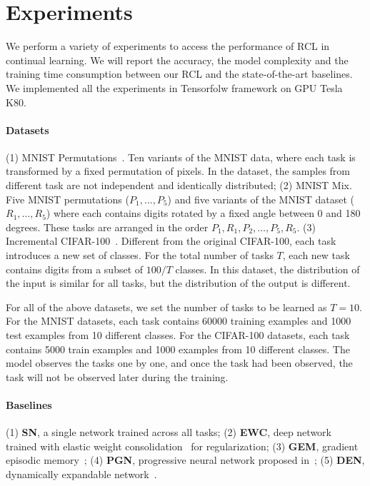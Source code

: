 \documentclass{article}
\begin{document}
\section{Experiments}
\label{sec:exp}
We perform a variety of experiments to access the performance of RCL in continual learning. We will report the accuracy, the model complexity and the training time consumption between our RCL and the state-of-the-art baselines. We implemented all the experiments in Tensorfolw framework on GPU Tesla K80. 

\paragraph{Datasets}
(1) MNIST Permutations~\cite{kirkpatrick1}. Ten variants of the MNIST data, where each task is transformed by a fixed permutation of
pixels. In the dataset, the samples from different task are not independent and identically distributed;
(2) MNIST Mix. Five MNIST permutations ($P_1,\dots,P_5$) and five variants of the MNIST dataset ($R_1,\dots,R_5$) where each contains digits rotated by a fixed angle between 0 and 180 degrees. These tasks are arranged in the order $P_1,R_1, P_2,\dots,P_5,R_5$.  
(3) Incremental CIFAR-100~\cite{icart}. Different from the original CIFAR-100, each task introduces a new set of classes. For the total number of tasks $T$, each new task contains digits from a subset of $100/T$ classes. In this dataset, the distribution of the input is similar for all tasks, but the distribution of the output is different.

For all of the above datasets, we set the number of tasks to be learned as $T = 10$. For the MNIST datasets, each task contains 60000 training examples and 1000 test examples from 10 different classes. For the CIFAR-100 datasets, each task contains 5000 train examples and 1000 examples from 10 different classes. The model observes the tasks one by one, and once the task had been observed, the task will not be observed later during the training.


\paragraph{Baselines}
(1) \textbf{SN}, a single network trained across all tasks; 
(2) \textbf{EWC}, deep network trained with elastic weight consolidation~\cite{kirkpatrick1} for regularization; 
(3) \textbf{GEM}, gradient episodic memory~\cite{GradientEpisodicMemory};
(4) \textbf{PGN}, progressive neural network proposed in~\cite{rusu1};
(5) \textbf{DEN}, dynamically expandable network~\cite{yoon1}.
\end{document}
